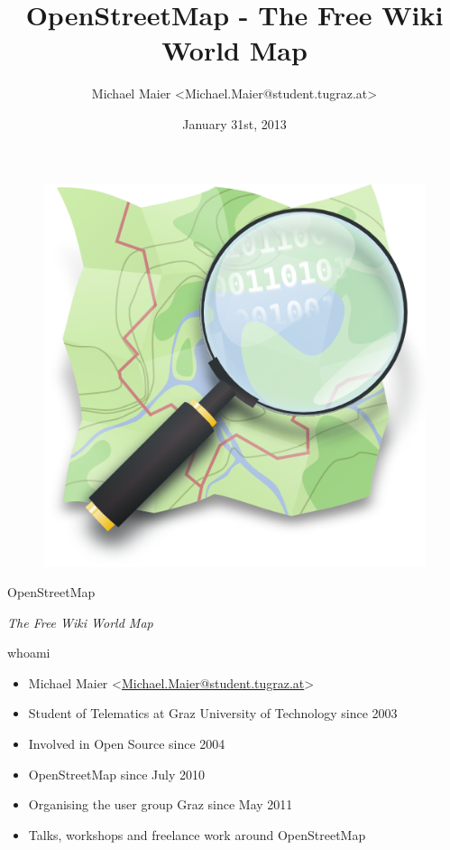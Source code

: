 \documentclass{beamer}
\title{OpenStreetMap - The Free Wiki World Map}
\author{Michael Maier \textless Michael.Maier@student.tugraz.at\textgreater}
\date{January 31st, 2013}
\begin{document}

\begin{frame} 


\begin{figure}
  \centering
  \includegraphics[width=.5\textwidth]{mag_map.png}
\end{figure}

\begin{center}
\Huge{OpenStreetMap\\}
\end{center}

\begin{center}
\Large{\emph{The Free Wiki World Map}}
\end{center}

\end{frame}



\begin{frame}{whoami}

  \begin{itemize}
    \item Michael Maier \textless \href{mailto:Michael.Maier@student.tugraz.at}{Michael.Maier@student.tugraz.at}\textgreater
    \item Student of Telematics at Graz University of Technology since 2003
    \item Involved in Open Source since 2004
    \item OpenStreetMap since July 2010
    \item Organising the user group Graz since May 2011
    \item Talks, workshops and freelance work around OpenStreetMap 
  \end{itemize}
\end{frame}
\end{document}
